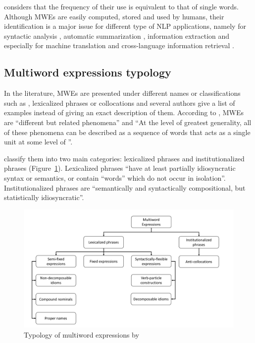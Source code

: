 \documentclass[output=paper,modfonts,nonflat]{langsci/langscibook}
\begin{document}
\cite{jackendoff1997architecture} considers that the frequency of their use is equivalent to that of single words.
Although MWEs are easily computed, stored and used by humans, their identification is a major issue for different type of NLP applications, namely for syntactic analysis \citep{nivre2004multiword,constant2011integrer}, automatic summarization \citep{hogan2007exploiting}, information extraction \citep{vechtomova2005role} and especially for machine translation and cross-language information retrieval \citep{carpuat2010task,ren2009improving}.

\subsection{Multiword expressions typology}\label{sec:semmar:3.1}

In the literature, MWEs are presented under different names or classifications such as , lexicalized phrases or collocations and several authors \citep{ramisch2013introduction} give a list of examples instead of giving an exact description of them.
According to \cite{calzolari2002}, MWEs are ``different but related phenomena'' and ``At the level of greatest generality, all of these phenomena can be described as a sequence of words that acts as a single unit at some level of ''.

\cite{sag02} classify them into two main categories: lexicalized phrases and institutionalized phrases (Figure~\ref{sem:fig:TypoMWE}).
Lexicalized phrases ``have at least partially idiosyncratic syntax or semantics, or contain ``words'' which do not occur in isolation''.
Institutionalized phrases are ``semantically and syntactically compositional, but statistically idiosyncratic''.

\begin{figure}
\includegraphics[width=\linewidth]{figures/figureTypologyMWE_NB.pdf}
\caption{\label{sem:fig:TypoMWE}Typology of multiword expressions by \cite{sag02}}
\end{figure}
\end{document}
